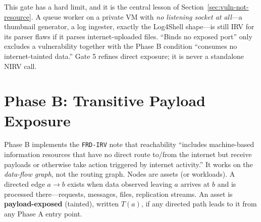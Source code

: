 \documentclass[11pt]{article}
\newcommand{\code}[1]{\texttt{#1}}
\begin{document}
This gate has a hard limit, and it is the central lesson of Section~\ref{sec:vuln-not-resource}. A queue worker on a private VM with \emph{no listening socket at all}---a thumbnail generator, a log ingester, exactly the Log4Shell shape---is still IRV for its parser flaws if it parses internet-uploaded files. ``Binds no exposed port'' only excludes a vulnerability together with the Phase B condition ``consumes no internet-tainted data.'' Gate 5 refines direct exposure; it is never a standalone NIRV call.

\section{Phase B: Transitive Payload Exposure}
\label{sec:phaseb}
Phase B implements the \code{FRD-IRV} note that reachability ``includes machine-based information resources that have no direct route to/from the internet but receive payloads or otherwise take action triggered by internet activity.'' It works on the \emph{data-flow graph}, not the routing graph. Nodes are assets (or workloads). A directed edge $a \rightarrow b$ exists when data observed leaving $a$ arrives at $b$ and is processed there---requests, messages, files, replication streams. An asset is \textbf{payload-exposed} (tainted), written $T(a)$, if any directed path leads to it from any Phase A entry point.
\end{document}

